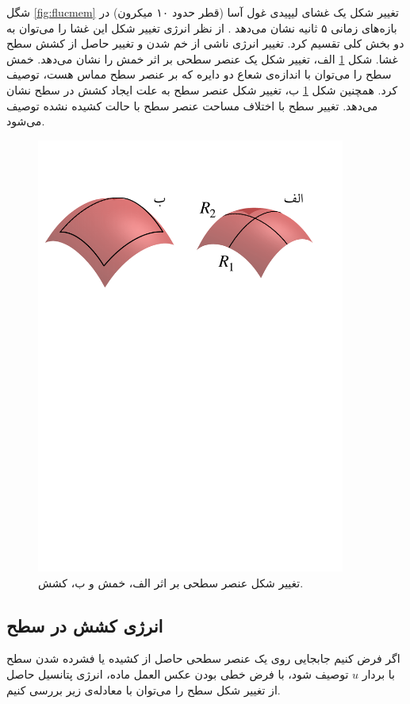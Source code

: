 شگل 
\ref{fig:flucmem}
تغییر شکل یک غشای لیپیدی غول آسا (قطر حدود ۱۰ میکرون) در بازه‌های زمانی ۵ ثانیه نشان می‌دهد
\cite{ParthasarathyMembraneMeasurement}
. از نظر انرژی تغییر شکل این غشا را می‌توان به دو بخش کلی تقسیم کرد. تغییر انرژی ناشی از خم شدن و تغییر حاصل از کشش سطح غشا. شکل
\ref{fig:elasticdeformation}
الف، تغییر شکل یک عنصر سطحی بر اثر خمش را نشان می‌دهد. خمش سطح را می‌توان با اندازه‌ی شعاع دو دایره که بر عنصر سطح مماس هست، توصیف کرد. همچنین شکل 
\ref{fig:elasticdeformation}
ب، تغییر شکل عنصر سطح به علت ایجاد کشش در سطح نشان می‌دهد. تغییر سطح با اختلاف مساحت عنصر سطح با حالت کشیده نشده توصیف می‌شود.
\begin{figure}[h]
\begin{center}
\includegraphics[width=4in]{Figs/surface elemnts.pages.pdf}
\caption{
تغییر شکل عنصر سطحی بر اثر الف، خمش و ب، کشش.
}
\label{fig:elasticdeformation}
\end{center}
\end{figure}

\subsection{
انرژی کشش در سطح
}
اگر فرض کنیم جابجایی روی یک عنصر سطحی حاصل از کشیده‌ یا فشرده شدن سطح با بردار 
$u$
توصیف شود، با فرض خطی بودن عکس العمل ماده، انرژی پتانسیل حاصل از تغییر شکل سطح را می‌توان با معادله‌ی زیر بررسی کنیم.


